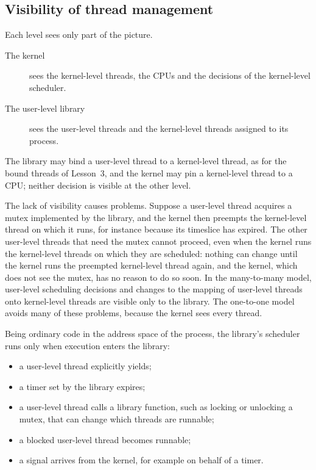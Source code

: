 \documentclass[../main.tex]{subfiles}
\begin{document}
\subsection{Visibility of thread management}

Each level sees only part of the picture.
\begin{description}
  \item[The kernel] sees the kernel-level threads, the CPUs and the
    decisions of the kernel-level scheduler.
  \item[The user-level library] sees the user-level threads and the
    kernel-level threads assigned to its process.
\end{description}
The library may bind a user-level thread to a kernel-level thread, as for
the bound threads of Lesson~3, and the kernel may pin a kernel-level
thread to a CPU; neither decision is visible at the other
level.

The lack of visibility causes problems.  Suppose a user-level thread
acquires a mutex implemented by the library, and the kernel then preempts
the kernel-level thread on which it runs, for instance because its
timeslice has expired.  The other user-level threads that need the mutex
cannot proceed, even when the kernel runs the kernel-level threads on which
they are scheduled: nothing can change until the kernel runs the preempted
kernel-level thread again, and the kernel, which does not see the mutex,
has no reason to do so soon.  In the many-to-many model, user-level
scheduling decisions and changes to the mapping of user-level threads onto
kernel-level threads are visible only to the library.  The one-to-one model
avoids many of these problems, because the kernel sees every
thread.

Being ordinary code in the address space of the process, the library's
scheduler runs only when execution enters the library:
\begin{itemize}
  \item a user-level thread explicitly yields;
  \item a timer set by the library expires;
  \item a user-level thread calls a library function, such as locking or
    unlocking a mutex, that can change which threads are runnable;
  \item a blocked user-level thread becomes runnable;
  \item a signal arrives from the kernel, for example on behalf of a timer.
\end{itemize}
\end{document}
